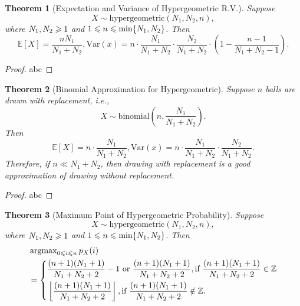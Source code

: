 \documentclass[openany,12pt]{book}
\newtheorem{theorem}{Theorem}[chapter]
\begin{document}
\begin{theorem}[Expectation and Variance of Hypergeometric R.V.]
  Suppose
  \begin{equation}
    X\sim\mathrm{hypergeometric}(N_1,N_2,n),
  \end{equation}
  where $N_1,N_2\geqslant1$ and $1\leqslant n\leqslant\min\{N_1,N_2\}$. Then
  $$
    \mathbb{E}\left[X\right]=\frac{nN_1}{N_1+N_2},
    \mathrm{Var}(x)=n\cdot\frac{N_1}{N_1+N_2}\cdot\frac{N_2}{N_1+N_2}\cdot\left(1-\frac{n-1}{N_1+N_2-1}\right).
  $$
\end{theorem}

\begin{proof}
  abc
\end{proof}

\begin{theorem}[Binomial Approximation for Hypergeometric]
  Suppose $n$ balls are drawn with replacement, i.e.,
  \begin{equation}
    X\sim \mathrm{binomial}\left(n,\frac{N_1}{N_1+N_2}\right).
  \end{equation}
  Then
  \begin{equation}
    \mathbb{E}\left[X\right]=n\cdot\frac{N_1}{N_1+N_2},  \mathrm{Var}(x)=n\cdot\frac{N_1}{N_1+N_2}\cdot\frac{N_2}{N_1+N_2}.
  \end{equation}
  Therefore, if $n\ll N_1+N_2$, then drawing with replacement is a good approximation of drawing without replacement.
\end{theorem}

\begin{proof}
  abc
\end{proof}

\begin{theorem}[Maximum Point of Hypergeometric Probability]
  Suppose
  \begin{equation}
    X\sim \mathrm{hypergeometric}(N_1,N_2,n),
  \end{equation}
  where $N_1,N_2\geqslant1$ and $1\leqslant n\leqslant\min\{N_1,N_2\}$. Then
  $$
    \begin{aligned}
       & \operatorname{argmax}_{0\leqslant i\leqslant n}{p_X(i)} \\
       & =\left\{
      \begin{aligned}
         & \frac{(n+1)(N_1+1)}{N_1+N_2+2}-1~\text{or}~\frac{(n+1)(N_1+1)}{N_1+N_2+2},      \text{if}~\frac{(n+1)(N_1+1)}{N_1+N_2+2}\in\mathbb{Z} \\
         & \left\lfloor \frac{(n+1)(N_1+1)}{N_1+N_2+2}\right\rfloor,  \text{if}~\frac{(n+1)(N_1+1)}{N_1+N_2+2}\notin\mathbb{Z}.
      \end{aligned}\right.
    \end{aligned}
  $$
\end{theorem}
\end{document}
